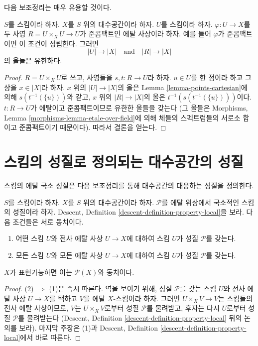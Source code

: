 \noindent
다음 보조정리는 매우 유용할 것이다.

\begin{lemma}
\label{lemma-finite-fibres-presentation}
$S$를 스킴이라 하자.
$X$를 $S$ 위의 대수공간이라 하자.
$U$를 스킴이라 하자. $\varphi : U \to X$를 두 사영
$R = U \times_X U \to U$가 준콤팩트인 에탈 사상이라 하자. 예를 들어
$\varphi$가 준콤팩트이면 이 조건이 성립한다. 그러면
$$
|U| \to |X|
\quad\text{and}\quad
|R| \to |X|
$$
의 올들은 유한하다.
\end{lemma}

\begin{proof}
$R = U \times_X U$로 쓰고, 사영들을 $s, t : R \to U$라 하자.
$u \in U$를 한 점이라 하고 그 상을 $x \in |X|$라 하자.
$x$ 위의 $|U| \to |X|$의 올은 Lemma
\ref{lemma-points-cartesian}에 의해 $s(t^{-1}(\{u\}))$와 같고,
$x$ 위의 $|R| \to |X|$의 올은 $t^{-1}(s(t^{-1}(\{u\})))$이다.
$t : R \to U$가 에탈이고 준콤팩트이므로 유한한 올들을 갖는다
(그 올들은 Morphisms, Lemma \ref{morphisms-lemma-etale-over-field}에 의해
체들의 스펙트럼들의 서로소 합이고 준콤팩트이기 때문이다).
따라서 결론을 얻는다.
\end{proof}

\section{스킴의 성질로 정의되는 대수공간의 성질}
\label{section-types-properties}

\noindent
스킴의 에탈 국소 성질은 다음 보조정리를 통해 대수공간의 대응하는
성질을 정의한다.

\begin{lemma}
\label{lemma-type-property}
$S$를 스킴이라 하자.
$X$를 $S$ 위의 대수공간이라 하자.
$\mathcal{P}$를 에탈 위상에서 국소적인 스킴의 성질이라 하자.
Descent, Definition \ref{descent-definition-property-local}을 보라.
다음 조건들은 서로 동치이다.
\begin{enumerate}
\item 어떤 스킴 $U$와 전사 에탈 사상 $U \to X$에 대하여
스킴 $U$가 성질 $\mathcal{P}$를 갖는다.
\item 모든 스킴 $U$와 모든 에탈 사상 $U \to X$에 대하여
스킴 $U$가 성질 $\mathcal{P}$를 갖는다.
\end{enumerate}
$X$가 표현가능하면 이는 $\mathcal{P}(X)$와 동치이다.
\end{lemma}

\begin{proof}
(2) $\Rightarrow$ (1)은 즉시 따른다.
역을 보이기 위해, 성질 $\mathcal{P}$를 갖는 스킴 $U$와 전사 에탈 사상
$U \to X$를 택하고 $V$를 에탈 $X$-스킴이라 하자. 그러면
$U \times_X V \rightarrow V$는 스킴들의 전사 에탈 사상이므로,
$V$는 $U \times_X V$로부터 성질 $\mathcal{P}$를 물려받고,
후자는 다시 $U$로부터 성질 $\mathcal{P}$를 물려받는다
(Descent, Definition \ref{descent-definition-property-local} 뒤의 논의를 보라).
마지막 주장은 (1)과 Descent, Definition
\ref{descent-definition-property-local}에서 바로 따른다.
\end{proof}

